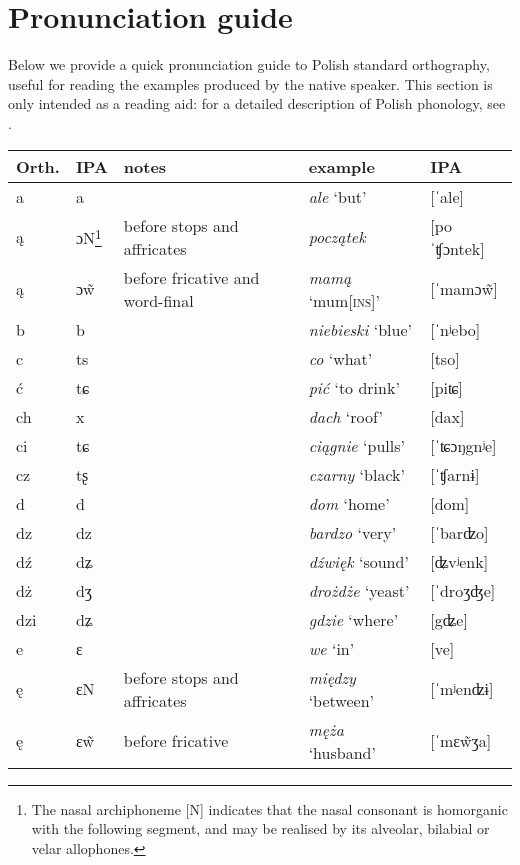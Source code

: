 \chapter{Pronunciation guide}\label{sec:9}
Below we provide a quick pronunciation guide to Polish standard orthography, useful for reading the examples produced by the native speaker. This section is only intended as a reading aid: for a detailed description of Polish phonology, see \citet{Gussman2007}.\bigskip

{\centering
\small
    \begin{tabularx}{\textwidth}{llXll}
        \lsptoprule
        Orth. & IPA & notes & example & IPA\\
        \midrule
        a & a &  & \textit{ale} `but' & [ˈale]\\
        ą & ɔN\footnote{The nasal archiphoneme [N] indicates that the nasal consonant is homorganic with the following segment, and may be realised by its alveolar, bilabial or velar allophones.} & before stops  and affricates & \textit{początek} & [poˈʧɔntek]\\
        ą & ɔ\~{w} & before fricative and word-final & \textit{mamą} `mum\textsc{[ins]}' & [ˈmamɔ\~{w}]\\
        b & b &  & \textit{niebieski} `blue' & [ˈnʲebo]\\
        c & ts &  & \textit{co} `what' & [tso]\\
        ć & tɕ &  & \textit{pić} `to drink' & [piʨ]\\
        ch & x &  & \textit{dach} `roof' & [dax]\\
        ci & tɕ &  & \textit{ciągnie} `pulls' & [ˈʨɔŋgnʲe]\\
        cz & tʂ &  & \textit{czarny} `black' & [ˈʧarnɨ]\\
        d & d &  & \textit{dom} `home' & [dom]\\
        dz & dz &  & \textit{bardzo} `very' & [ˈbarʣo]\\
        dź & dʑ &  & \textit{dźwięk} `sound' & [ʥvʲenk]\\
        dż & dʒ &  & \textit{drożdże} `yeast' & [ˈdroʒʤe]\\
        dzi & dʑ &  & \textit{gdzie} `where' & [gʥe]\\
        e & ɛ &  & \textit{we} `in' & [ve]\\
        ę & ɛN & before stops and affricates & \textit{między} `between' & [ˈmʲenʣɨ]\\
        ę & ɛ\~{w} & before fricative & \textit{męża} `husband' & [ˈmɛ\~{w}ʒa]\\

\end{tabularx}}
